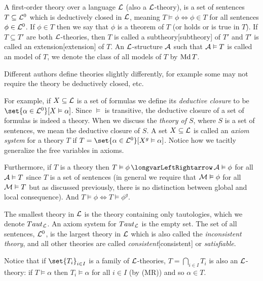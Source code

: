     A {\emphcolor first-order theory} over a language ${\cal L}$ (also a {\emphcolor ${\cal L}$-theory}), is a set of sentences $T\subseteq{\cal L}^0$ which is
    {\emphcolor deductively closed} in ${\cal L}$, meaning $T\vDash\phi\iff\phi\in T$ for all sentences $\phi\in{\cal L}^0$.
    If $\phi\in T$ then we say that $\phi$ is a {\emphcolor theorem} of $T$ (or holds or is true in $T$).
    If $T\subseteq T'$ are both ${\cal L}$-theories, then $T$ is called a {\emphcolor subtheory}[subtheory] of $T'$ and $T'$ is called an
    {\emphcolor extension}[extension] of $T$.
    An ${\cal L}$-structure ${\cal A}$ such that ${\cal A}\vDash T$ is called an {\emphcolor model} of $T$, we denote the class of all models of $T$ by $\mathop{\rm Md} T$.

\edefn

Different authors define theories slightly differently, for example some may not require the theory be deductively closed, etc.

For example, if $X\subseteq{\cal L}$ is a set of formulas we define its {\it deductive closure} to be $\set{\alpha\in{\cal L}^0}[X\vDash\alpha]$.
Since $\vDash$ is transitive, the deductive closure of a set of formulas is indeed a theory.
When we discuss the {\it theory of $S$}, where $S$ is a set of sentences, we mean the deductive closure of $S$.
A set $X\subseteq{\cal L}$ is called an {\it axiom system} for a theory $T$ if $T=\set{\alpha\in{\cal L}^0}[X^g\vDash\alpha]$.
Notice how we tacitly generalize the free variables in axioms.

Furthermore, if $T$ is a theory then $T\vDash\phi\iff{\cal A}\vDash\phi$ for all ${\cal A}\vDash T$ since $T$ is a set of sentences (in general we require that ${\cal M}\vDash\phi$ for all ${\cal M}\vDash T$
but as discussed previously, there is no distinction between global and local consequence).
And $T\vDash\phi\iff T\vDash\phi^g$.

The smallest theory in ${\cal L}$ is the theory containing only tautologies, which we denote ${\sl Taut}_{\cal L}$.
An axiom system for ${\sl Taut}_{\cal L}$ is the empty set.
The set of all sentences, ${\cal L}^0$, is the largest theory in ${\cal L}$ which is also called the {\it inconsistent theory}, and all other theories are called
{\it consistent}[consistent] or {\it satisfiable}.

Notice that if $\set{T_i}_{i\in I}$ is a family of ${\cal L}$-theories, $T=\bigcap_{i\in I}T_i$ is also an ${\cal L}$-theory: if $T\vDash\alpha$ then $T_i\vDash\alpha$ for all $i\in I$ (by (MR)) and so
$\alpha\in T$.


